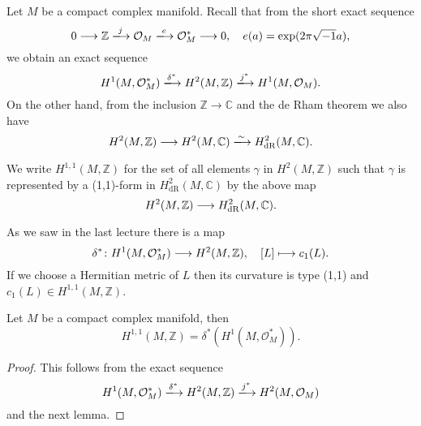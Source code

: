 \documentclass[12pt]{article}
\begin{document}
Let \(M\) be a compact complex manifold. Recall that from the short exact sequence \[
  0\lrr \mathbb{Z}\xrr{j}\mathcal{O}_M\xrr{e}\mathcal{O}_M^*\lrr 0,\quad
  e(a)=\exp(2\pi\sqrt{-1}a)
,\] we obtain an exact sequence \[
  H^1(M,\mathcal{O}_M^*)\xrr{\delta^*}H^2(M,\mathbb{Z})\xrr{j^*}H^1(M,\mathcal{O}_M)
.\] On the other hand, from the inclusion \(\mathbb{Z}\to \mathbb{C}\) and the
de Rham theorem we also have \[
  H^2(M,\mathbb{Z})\lrr H^2(M,\mathbb{C})\xrr{\sim} H_{\mathrm{dR}}^2(M,\mathbb{C})
.\] 

\begin{definition}
  We write \(H^{1,1}(M,\mathbb{Z})\) for the set of all elements \(\gamma\) in
  \(H^2(M,\mathbb{Z})\) such that \(\gamma\) is represented by a (1,1)-form in
  \(H_{\mathrm{dR}}^2(M,\mathbb{C})\) by the above map \[
    H^2(M,\mathbb{Z})\longrightarrow H_{\mathrm{dR}}^2(M,\mathbb{C})
  .\] 
\end{definition}
As we saw in the last lecture there is a map \[
  \delta^*\colon H^1(M,\mathcal{O}_M^*)\longrightarrow H^2(M,\mathbb{Z}),\quad
  [L]\longmapsto c_1(L)
.\] If we choose a Hermitian metric of \(L\) then its curvature is type (1,1) and
\(c_1(L)\in H^{1,1}(M,\mathbb{Z})\).

\begin{theorem}
  Let \(M\) be a compact complex manifold, then \[
    H^{1,1}(M,\mathbb{Z})=\delta^*(H^1(M,\mathcal{O}_M^*))
  .\] 
\end{theorem}
\begin{proof}
  This follows from the exact sequence \[
    H^1(M,\mathcal{O}_M^*)\xrr{\delta^*}H^2(M,\mathbb{Z})\xrr{j^*}H^2(M,\mathcal{O}_M)
  \] and the next lemma.
\end{proof}
\end{document}

